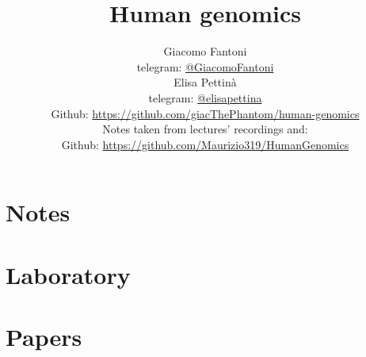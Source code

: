 

\title{\Huge\textbf{{Human genomics}}}

\author{
  Giacomo Fantoni \\
  \small telegram: \href{https://t.me/GiacomoFantoni}{@GiacomoFantoni} \\[3pt]
  Elisa Pettin\`a \\
  \small telegram: \href{https://t.me/elisapettina}{@elisapettina} \\[3pt]
  \small Github: \href{https://github.com/giacThePhantom/human-genomics}{https://github.com/giacThePhantom/human-genomics}\\
  Notes taken from lectures' recordings and:\\
  \small Github: \href{https://github.com/Maurizio319/HumanGenomics}{https://github.com/Maurizio319/HumanGenomics}
}




  \maketitle
  \tableofcontents

  \part{Notes}
    
    
    
    
    
    
    
    
    
    

  \part{Laboratory}
    
    
    
    
    
    
    

  \part{Papers}
    
    
    
    
    
    


